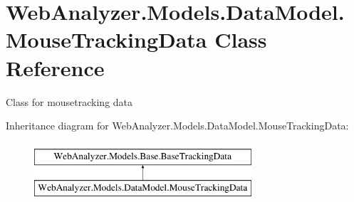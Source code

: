 \hypertarget{class_web_analyzer_1_1_models_1_1_data_model_1_1_mouse_tracking_data}{}\section{Web\+Analyzer.\+Models.\+Data\+Model.\+Mouse\+Tracking\+Data Class Reference}
\label{class_web_analyzer_1_1_models_1_1_data_model_1_1_mouse_tracking_data}


Class for mousetracking data  


Inheritance diagram for Web\+Analyzer.\+Models.\+Data\+Model.\+Mouse\+Tracking\+Data\+:\begin{figure}[H]
\begin{center}
\leavevmode
\includegraphics[height=2.000000cm]{class_web_analyzer_1_1_models_1_1_data_model_1_1_mouse_tracking_data}
\end{center}
\end{figure}
